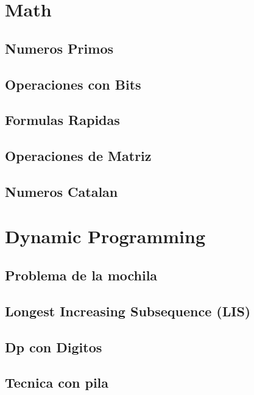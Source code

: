 \section{Math}
\subsection{Numeros Primos}
\raggedbottom
\hrulefill
\subsection{Operaciones con Bits}
\raggedbottom
\hrulefill
\subsection{Formulas Rapidas}
\raggedbottom
\hrulefill
\subsection{Operaciones de Matriz}
\raggedbottom
\hrulefill
\subsection{Numeros Catalan}
\raggedbottom
\hrulefill
\newpage

\section{Dynamic Programming}
\subsection{Problema de la mochila}
\raggedbottom
\hrulefill
\subsection{Longest Increasing Subsequence (LIS)}
\raggedbottom
\hrulefill
\subsection{Dp con Digitos}
\raggedbottom
\hrulefill
\subsection{Tecnica con pila}
\raggedbottom
\hrulefill
\newpage

